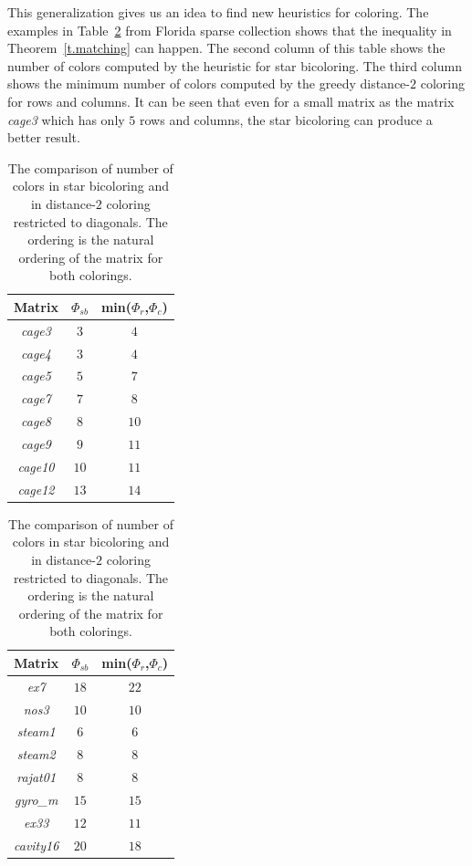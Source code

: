 \documentclass[12pt, twoside,a4paper,toc=bibliography]{scrbook}
\begin{document}
This generalization gives us an idea to find new heuristics for coloring.
The examples in Table~\ref{table.starbic.d2.diag} from Florida sparse collection shows that the
inequality in Theorem~\ref{t.matching} can happen. The second column of this table
shows the number of colors computed by the heuristic for star bicoloring.
The third column shows the minimum number of colors computed by the greedy distance-$2$ coloring
for rows and columns.
It can be seen that even for a small matrix as the matrix \textit{cage3} which has only
$5$ rows and columns, the star bicoloring can produce a better result.

\begin{table}
\centering
\begin{tabular}{|c|c|c|}
\hline
Matrix & $\Phi_{sb}$ & min($\Phi_r$,$\Phi_c$)\\\hline
\textit{cage3} & $3$ & $4$\\\hline
\textit{cage4} & $3$ & $4$ \\\hline
\textit{cage5} & $5$ & $7$\\\hline
\textit{cage7} & $7$  & $8$\\\hline
\textit{cage8} & $8$  & $10$\\\hline
\textit{cage9} & $9$  & $11$\\\hline
\textit{cage10} & $10$ & $11$\\\hline
\textit{cage12} & $13$ &  $14$\\\hline
\end{tabular}
\hfill
\begin{tabular}{|c|c|c|}
\hline
Matrix & $\Phi_{sb}$ & min($\Phi_r$,$\Phi_c$)\\\hline
\textit{ex7} & $18$ & $22$ \\\hline
\textit{nos3} & $10$ & $10$ \\\hline
\textit{steam1} & $6$ & $6$ \\\hline
\textit{steam2} & $8$ & $8$ \\\hline
\textit{rajat01} & $8$ & $8$ \\\hline
\textit{gyro\_m} & $15$ & $15$\\\hline
\textit{ex33} & $12$ & $11$\\\hline
\textit{cavity16} & $20$ & $18$ \\\hline
\end{tabular}

\caption{The comparison of number of colors in star bicoloring and in
distance-$2$ coloring restricted to diagonals.
The ordering is the natural ordering of the matrix for both colorings.}
\label{table.starbic.d2.diag}
\end{table}
\end{document}
